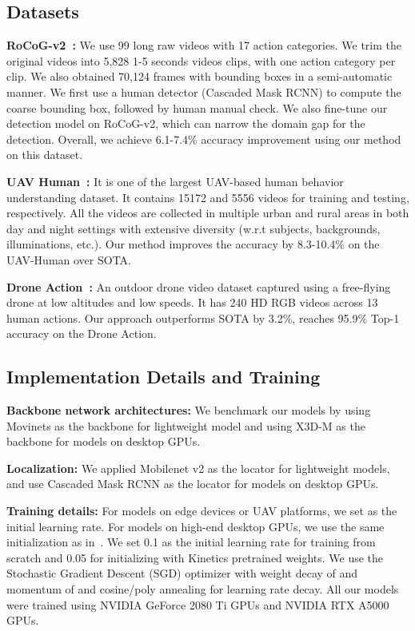 \documentclass[letterpaper, 10 pt, conference]{ieeeconf}
\begin{document}
\subsection{Datasets}

\noindent  \textbf{RoCoG-v2~\cite{de2022icras,de2020vision}:} We use 99 long raw videos with 17 action categories. We trim the original videos into 5,828 1-5 seconds videos clips, with one action category per clip. We also obtained 70,124 frames with bounding boxes in a semi-automatic manner. We first use a human detector (Cascaded Mask RCNN) to compute the coarse bounding box, followed by human manual check. We also fine-tune our detection model on RoCoG-v2, which can narrow the domain gap for the detection. Overall, we achieve 6.1-7.4\% accuracy improvement using our method on this dataset.

\noindent  \textbf{UAV Human~\cite{li2021uav}:} It is one of the largest UAV-based human behavior understanding dataset. It contains 15172 and 5556 videos for training and testing, respectively. All the videos are collected in multiple urban and rural areas in both day and night  settings with extensive diversity (w.r.t subjects, backgrounds, illuminations, etc.). Our method improves the accuracy by 8.3-10.4\% on the UAV-Human over SOTA.

\noindent  \textbf{Drone Action~\cite{perera2019drone}:} An outdoor drone video dataset captured using a free-flying drone at low altitudes and low speeds. It has 240 HD RGB videos across 13 human actions. Our approach outperforms SOTA by 3.2\%, reaches 95.9\% Top-1 accuracy on the Drone Action.

\subsection{Implementation Details and Training}
\noindent \textbf{Backbone network architectures:} We benchmark our models by using Movinets\cite{kondratyuk2021movinets} as the backbone for lightweight model and using X3D-M \cite{feichtenhofer2020x3d} as the backbone for models on desktop GPUs.

\noindent \textbf{Localization:} We applied Mobilenet v2\cite{sandler2018mobilenetv2} as the locator for lightweight models, and use Cascaded Mask RCNN\cite{hasan2021generalizable} as the locator for models on desktop GPUs.

\noindent \textbf{Training details:} For models on edge devices or UAV platforms, we set  as the initial learning rate. For models on high-end desktop GPUs, we use the same initialization as in~\cite{kothandaraman2022fourier}. We set 0.1 as the initial learning rate for training from scratch and 0.05 for initializing with Kinetics pretrained weights. We use the Stochastic Gradient Descent (SGD) optimizer with weight decay of  and momentum of  and cosine/poly annealing for learning rate decay. All our models were trained using NVIDIA GeForce 2080 Ti GPUs and NVIDIA RTX A5000 GPUs.
\end{document}
